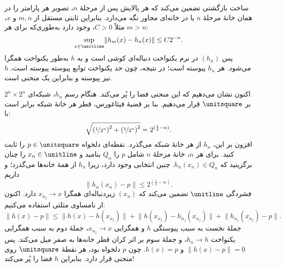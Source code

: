 \documentclass[../../../include/open-logic-section]{subfiles}
\begin{document}
ساخت بازگشتی تضمین می‌کند که هر پالایش پس از مرحلهٔ $n$، تصویر هر پارامتر
را در همان خانهٔ مرحلهٔ $n$ یا در خانه‌ای مجاور نگه می‌دارد. بنابراین
ثابتی مستقل از $m,n$ و $x$، مثلاً $C>0$، وجود دارد به‌طوری‌که برای هر
$m>n$:
\[
  \sup_{x\in\unitline}\lVert h_m(x)-h_n(x)\rVert \leq C2^{-n}.
\]
پس $(h_n)$ در نرم یکنواخت دنباله‌ای کوشی است و به $h$ به‌طور یکنواخت
همگرا می‌شود. هر $h_n$ پیوسته است؛ در نتیجه، چون حد یکنواخت توابع پیوسته
پیوسته است، $h$ نیز پیوسته و بنابراین یک منحنی است.

اکنون نشان می‌دهیم که این منحنی فضا را پُر می‌کند. هنگام رسم $h_n$، شبکه‌ای
$2^n\times2^n$ بر $\unitsquare$ قرار می‌دهیم. بنا بر قضیهٔ فیثاغورس، قطر
هر خانهٔ شبکه برابر است با:
\[
\sqrt{\left(\nicefrac{1}{2^{n}}\right)^2+
\left(\nicefrac{1}{2^{n}}\right)^2} = 2^{(\frac{1}{2}-n)}.
\]
افزون بر این، $h_n$ از هر خانهٔ شبکه می‌گذرد. نقطه‌ای دلخواه
$p\in\unitsquare$ را ثابت کنید. برای هر $n$، خانهٔ مرحلهٔ $n$ شامل $p$ را
$Q_n$ بنامید و $x_n\in\unitline$ را چنان برگزینید که
$h_n(x_n)\in Q_n$. چنین انتخابی وجود دارد، زیرا $h_n$ از همهٔ خانه‌ها
می‌گذرد؛ و داریم
\[
  \lVert h_n(x_n)-p\rVert \leq 2^{(\frac{1}{2}-n)}.
\]
فشردگی $\unitline$ تضمین می‌کند که $(x_n)$ زیر‌دنباله‌ای همگرا
$x_{n_j}\to x$ دارد. اکنون از نامساوی مثلثی استفاده می‌کنیم:
\[
\lVert h(x)-p\rVert \leq
\lVert h(x)-h(x_{n_j})\rVert
+\lVert h(x_{n_j})-h_{n_j}(x_{n_j})\rVert
+\lVert h_{n_j}(x_{n_j})-p\rVert.
\]
جملهٔ نخست به سبب پیوستگی $h$ و همگرایی $x_{n_j}\to x$، جملهٔ دوم به
سبب همگرایی یکنواخت $h_n\to h$، و جملهٔ سوم بر اثر کران قطر خانه‌ها به
صفر میل می‌کند. پس $\lVert h(x)-p\rVert=0$ و $h(x)=p$. چون $p$ دلخواه
بود، هر نقطهٔ $\unitsquare$ روی منحنی قرار دارد. بنابراین $h$ فضا را پُر
می‌کند!
\end{document}

